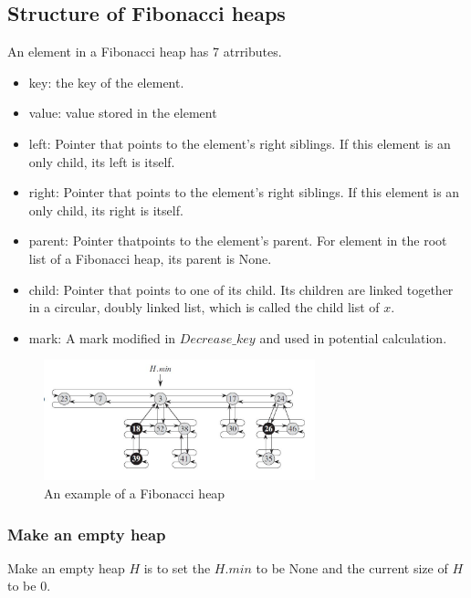 \documentclass[catalog.tex]{subfiles}
\begin{document}
\subsection*{Structure of Fibonacci heaps}
An element in a Fibonacci heap has 7 atrributes. ~\cite{intro3rd} 
\begin{itemize}
	\item key: the key of the element.
	\item value: value stored in the element
	\item left: Pointer that points to the element's right siblings. If this element is an only child, its left is itself.
	\item right:  Pointer that points to the element's right siblings. If this element is an only child, its right is itself.
	\item parent:  Pointer thatpoints to the element's parent. For element in the root list of a Fibonacci heap, its parent is None. 
	\item child:  Pointer that points to one of its child. Its children are linked together in a circular, doubly linked list, which is called the child list of $x$.
	\item mark: A mark modified in $Decrease\_key$ and used in potential calculation.
\end{itemize}
\begin{figure}[h]
	\centering
	\includegraphics[width=0.7\textwidth]{problem-6.jpg}
	\caption{An example of a Fibonacci heap}
\end{figure}
\subsubsection*{Make an empty heap}
Make an empty heap $H$ is to set the $H.min$ to be None and the current size of $H$ to be 0.  
\newpage
\end{document}
